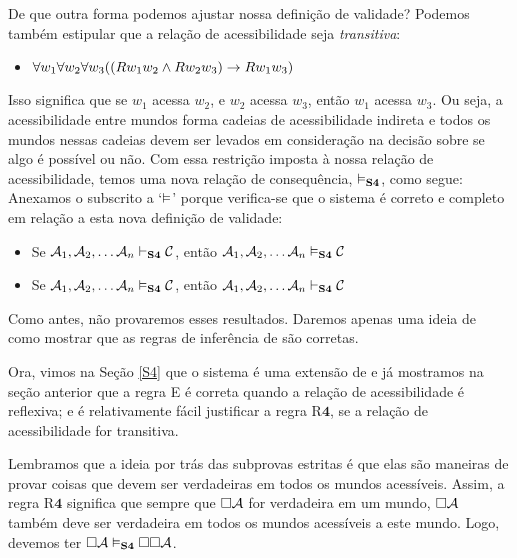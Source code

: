 De que outra forma podemos ajustar nossa definição de validade? Podemos também estipular que a relação de acessibilidade seja \emph{transitiva}:
\begin{itemize}
	\item $\forall w_1\forall w_2\forall w_3 ((Rw_1w_2 \wedge Rw_2w_3)\rightarrow Rw_1w_3)$
\end{itemize}
Isso significa que se  $w_1$ acessa $w_2$, e $w_2$ acessa $w_3$, então  $w_1$ acessa $w_3$. Ou seja, a acessibilidade entre mundos forma cadeias de acessibilidade indireta e todos os mundos nessas cadeias devem ser levados em consideração na decisão sobre se algo é possível ou não. Com essa restrição imposta  à nossa relação de acessibilidade, temos uma nova relação de consequência, $\vDash_{\mathbf{S4}}$, como segue:
Anexamos o subscrito \mlSfour{}  a `$\vDash$' porque verifica-se que o sistema \mlSfour{} é correto e completo em relação a esta nova definição de validade:
\begin{itemize}
	\item Se $\mathcal{A}_1,\mathcal{A}_2, \dots \mathcal{A}_n\vdash_{\mathbf{S4}}\mathcal{C}$, então $\mathcal{A}_1,\mathcal{A}_2, \dots \mathcal{A}_n\vDash_{\mathbf{S4}}\mathcal{C}$
	\item Se $\mathcal{A}_1,\mathcal{A}_2, \dots \mathcal{A}_n\vDash_{\mathbf{S4}}\mathcal{C}$, então $\mathcal{A}_1,\mathcal{A}_2, \dots \mathcal{A}_n\vdash_{\mathbf{S4}}\mathcal{C}$
\end{itemize}
Como antes, não provaremos esses resultados. Daremos apenas uma ideia de como mostrar que as regras de inferência de \mlSfour{} são corretas.

Ora, vimos na Seção \ref{S4} que o sistema \mlSfour{} é uma extensão de \mlT{} e já mostramos na seção anterior que  a regra  \ebox E é correta quando a relação de acessibilidade é reflexiva; e é relativamente fácil justificar  a regra  R$\mathbf{4}$, se a relação de acessibilidade for transitiva.

 

Lembramos que a ideia por trás das subprovas estritas é que elas são maneiras de provar coisas que devem ser verdadeiras em todos os mundos acessíveis. Assim, a regra R$\mathbf{4}$  significa que sempre que $\Box \mathcal{A}$ for verdadeira em um mundo, $\Box \mathcal{A}$ também deve ser verdadeira  em todos os mundos acessíveis  a este mundo. Logo, devemos ter $\Box\mathcal{A} \vDash_{\mathbf{S4}} \Box\Box\mathcal{A}$.

